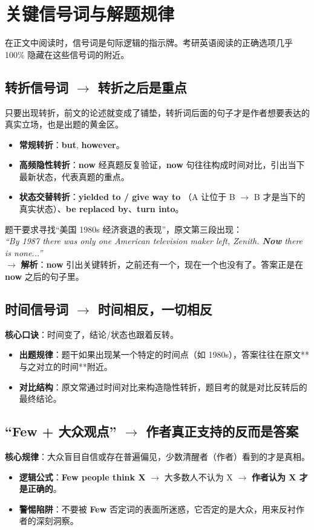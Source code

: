 \documentclass[cn,normal,11pt]{elegantnote}
\newcommand{\retrokey}[1]{{\color{accentcolor}\textbf{#1}}}
\begin{document}
\section{关键信号词与解题规律}
在正文中阅读时，信号词是句际逻辑的指示牌。考研英语阅读的正确选项几乎 100\% 隐藏在这些信号词的附近。

\subsection{转折信号词 \ensuremath{\rightarrow} 转折之后是重点}
只要出现转折，前文的论述就变成了铺垫，转折词后面的句子才是作者想要表达的真实立场，也是出题的黄金区。
\begin{itemize}
  \item \textbf{常规转折}：\textbf{but}, \textbf{however}。
  \item \textbf{高频隐性转折}：\retrokey{now} 经真题反复验证，\retrokey{now} 句往往构成时间对比，引出当下最新状态，代表真题的重点。
  \item \textbf{状态交替转折}：\retrokey{yielded to / give way to} （A 让位于 B $\rightarrow$ B 才是当下的真实状态）、\textbf{be replaced by}、\textbf{turn into}。
\end{itemize}

\begin{example}
  题干要求寻找“美国 1980s 经济衰退的表现”，原文第三段出现：\\
  \textit{“By 1987 there was only one American television maker left, Zenith. \retrokey{Now} there is none...”}\\
  $\rightarrow$ \textbf{解析}：\textbf{now} 引出关键转折，之前还有一个，现在一个也没有了。答案正是在 \textbf{now} 之后的句子里。
\end{example}

\subsection{时间信号词 \ensuremath{\rightarrow} 时间相反，一切相反}
\textbf{核心口诀}：时间变了，结论/状态也跟着反转。
\begin{itemize}
  \item \textbf{出题规律}：题干如果出现某一个特定的时间点（如 1980s），答案往往在原文**与之对立的时间**附近。
  \item \textbf{对比结构}：原文常通过时间对比来构造隐性转折，题目考的就是对比反转后的最终结论。
\end{itemize}

\subsection{“Few + 大众观点” \ensuremath{\rightarrow} 作者真正支持的反而是答案}
\textbf{核心规律}：大众盲目自信或存在普遍偏见，少数清醒者（作者）看到的才是真相。
\begin{itemize}
  \item \textbf{逻辑公式}：\textbf{Few people think X} $\rightarrow$ 大多数人不认为 X $\rightarrow$ \retrokey{作者认为 X 才是正确的}。
  \item \textbf{警惕陷阱}：不要被 \textbf{Few} 否定词的表面所迷惑，它否定的是大众，用来反衬作者的深刻洞察。
\end{itemize}
\end{document}
